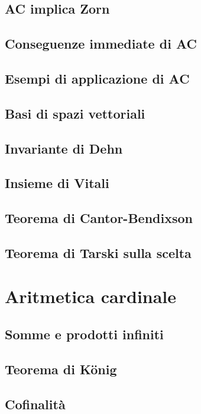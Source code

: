 \documentclass[11pt]{scrartcl}
\begin{document}
\subsection{AC implica Zorn}
\newpage
\subsection{Conseguenze immediate di AC}
\newpage
\subsection{Esempi di applicazione di AC}
\newpage
\subsection{Basi di spazi vettoriali}
\newpage
\subsection{Invariante di Dehn}
\newpage
\subsection{Insieme di Vitali}
\newpage
\subsection{Teorema di Cantor-Bendixson}
\newpage
\subsection{Teorema di Tarski sulla scelta}









\newpage
\section{Aritmetica cardinale}
\subsection{Somme e prodotti infiniti}
\newpage
\subsection{Teorema di König}
\newpage
\subsection{Cofinalità}
\newpage
\end{document}
